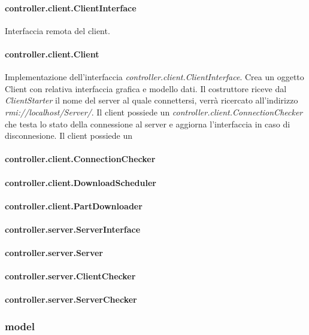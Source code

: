 \documentclass[
10pt, %
a4paper, %
oneside, %
BCOR5mm, %
]{scrartcl}
\begin{document}
 			\paragraph{controller.client.ClientInterface}
 				Interfaccia remota del client.
 			\paragraph{controller.client.Client}
 				Implementazione dell'interfaccia \emph{controller.client.ClientInterface}. Crea un oggetto Client con relativa interfaccia grafica e modello dati. Il costruttore riceve dal \emph{ClientStarter} il nome del server al quale connettersi, verrà ricercato all'indirizzo \emph{rmi://localhost/Server/}. Il client possiede un \emph{controller.client.ConnectionChecker} che testa lo stato della connessione al server e aggiorna l'interfaccia in caso di disconnesione. Il client possiede un \
 			\paragraph{controller.client.ConnectionChecker}
 			\paragraph{controller.client.DownloadScheduler}
 			\paragraph{controller.client.PartDownloader}


 			\paragraph{controller.server.ServerInterface}
 			\paragraph{controller.server.Server}
 			\paragraph{controller.server.ClientChecker}
 			\paragraph{controller.server.ServerChecker}

 		\subsubsection{model}
\end{document}
